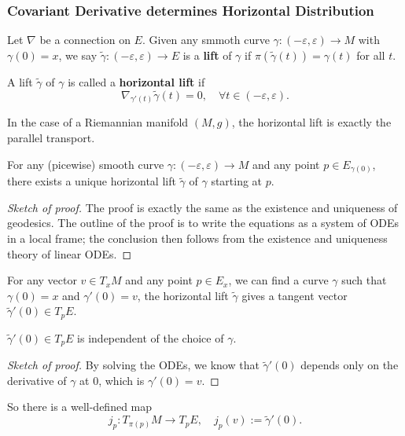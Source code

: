 \subsubsection{Covariant Derivative determines Horizontal Distribution}
Let $\nabla$ be a connection on $E$. Given any smmoth curve $\gamma: (-\varepsilon,\varepsilon) \to M$ with $\gamma(0) = x$, 
we say $\tilde{\gamma}: (-\varepsilon,\varepsilon) \to E$ is a 
\textbf{lift} of $\gamma$ if $\pi(\tilde{\gamma}(t)) = \gamma(t)$ for all $t$. 
\begin{definition}
    A lift $\tilde{\gamma}$ of $\gamma$ is called a \textbf{horizontal lift} if 
    \begin{equation*}
        \nabla_{\gamma'(t)} \tilde{\gamma}(t) = 0, \quad \forall t\in (-\varepsilon,\varepsilon).
    \end{equation*}
\end{definition}
\begin{example}
    In the case of a Riemannian manifold $(M,g)$, the horizontal lift is exactly the parallel transport.
\end{example}
\begin{proposition}
    For any (picewise) smooth curve $\gamma: (-\varepsilon,\varepsilon) \to M$ and any point $p\in E_{\gamma(0)}$, 
    there exists a unique horizontal lift $\tilde{\gamma}$ of $\gamma$ starting at $p$.
\end{proposition}
\begin{proof}[Sketch of proof]
    The proof is exactly the same as the existence and uniqueness of geodesics. 
    The outline of the proof is to write the equations as a system of ODEs in a local frame; 
    the conclusion then follows from the existence and uniqueness theory of linear ODEs.
\end{proof}
For any vector $v\in T_x M$ and any point $p\in E_x$, we can find a curve $\gamma$ such that $\gamma(0)=x$ and $\gamma'(0)=v$, 
the horizontal lift $\tilde{\gamma}$ gives a tangent vector $\tilde{\gamma}'(0)\in T_p E$. 
\begin{fact}
    $\tilde{\gamma}'(0)\in T_pE$ is independent of the choice of $\gamma$.
\end{fact}
\begin{proof}[Sketch of proof]
    By solving the ODEs, we know that $\tilde{\gamma}'(0)$ depends only on the derivative of $\gamma$ at $0$, 
    which is $\gamma'(0)=v$.
\end{proof}
So there is a well-defined map 
\begin{equation*}
    j_p: T_{\pi(p)} M \to T_p E, \quad j_p(v) := \tilde{\gamma}'(0).
\end{equation*}
